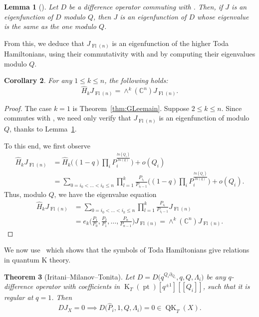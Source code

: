 \documentclass[11pt]{article}
\numberwithin{equation}{section}
\numberwithin{equation}{section}
\newtheorem{Theorem}{Theorem}[section]
\newtheorem{Corollary}[Theorem]{Corollary}
\newtheorem{Lemma}[Theorem]{Lemma}
\theoremstyle{definition}
\DeclareMathOperator{\Fl}{Fl}
\DeclareMathOperator{\QK}{QK}
\DeclareMathOperator{\K}{K}
\DeclareMathOperator{\pt}{pt}
\begin{document}
\begin{Lemma}[{\cite[p.~9]{givental_lee}}]\label{lemma:modQ}
Let $D$ be a difference operator commuting with . Then, if $J$ is an eigenfunction of $D$ modulo $Q$, then $J$ is an eigenfunction of $D$ whose eigenvalue is the same as the one modulo $Q$.
\end{Lemma}

From this, we deduce that $J_{\Fl(n)}$ is an eigenfunction of the higher Toda Hamiltonians, using their commutativity with  and by computing their eigenvalues modulo $Q$.

\begin{Corollary}\label{cor:Hk-eigenval} For any $1 \le k \le n$, the following holds:
\[ \widehat{H}_kJ_{\Fl(n)}=\wedge^k(\mathbb{C}^n) J_{\Fl(n)} . \]
\end{Corollary}
\begin{proof} The case $k=1$ is Theorem~\ref{thm:GLeemain}. Suppose $2 \le k \le n$. Since  commutes with , we need only verify that $J_{\Fl(n)}$ is an eigenfunction of  modulo $Q$, thanks to Lemma~\ref{lemma:modQ}.

To this end, we first observe
\begin{align*}
\widehat{H}_k J_{\Fl(n)}&{}=\widehat{H}_k\biggl((1-q)\prod_i P_i^{\frac{ln(Q_i)}{ln(q)}}\biggr) + o(Q_i) \\
&{}=
\sum_{0= i_0<\dots<i_k\leq n}\prod_{l=1}^k \frac{P_{i_l}}{P_{i_l-1}}\biggl((1-q)\prod_i P_i^{\frac{ln(Q_i)}{ln(q)}}\biggr)+o(Q_i) .
\end{align*}
Thus, modulo $Q$, we have the eigenvalue equation
\begin{align*}
\widehat{H}_k J_{\Fl(n)}&{}=\sum_{0= i_0<\dots<i_k\leq n}
\prod_{l=1}^k \frac{P_{i_l}}{P_{i_l-1}}J_{\Fl(n)}\\
&{}=
e_k\biggl(\frac{P_1}{P_0},\frac{P_2}{P_1},\dots,\frac{P_{n}}{P_{n-1}}\biggr)J_{\Fl(n)}=\wedge^k(\mathbb{C}^n)J_{\Fl(n)} .
\tag*{\qed}
\end{align*}
\renewcommand{\qed}{}
\end{proof}

We now use~\cite[Proposition~2.12]{Iritani:2013qka} which shows that the symbols of
Toda Hamiltonians give relations in quantum K theory.

\begin{Theorem}[Iritani--Milanov--Tonita]\label{thm:IMT}
Let $D=D\bigl(q^{Q_i\partial_{Q_i}},q,Q,\Lambda_i\bigr)$ be any $q$-difference operator
with coefficients in $\K_T(\pt)[q^{\pm 1}][\![Q_i]\!]$, such that it is regular
at $q=1$. Then
\[DJ_X=0\implies D\bigl(\widehat{P}_i,1,Q,\Lambda_i\bigr)=0 \in \QK_T(X) .\]
\end{Theorem}
\end{document}
